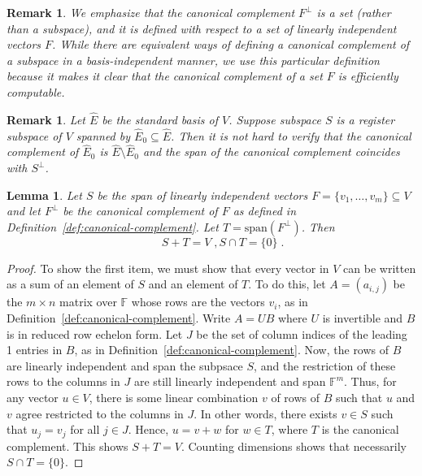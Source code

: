 \documentclass[11pt]{article}
\newtheorem{lemma}[theorem]{Lemma}
\newtheorem{remark}[theorem]{Remark}
\theoremstyle{definition}
\newcommand{\F}{\ensuremath{\mathbb{F}}}
\begin{document}
\begin{remark}
We emphasize that the canonical complement $F^\perp$ is a \emph{set} (rather than
a subspace), and it is defined with respect to a \emph{set} of linearly
independent vectors $F$. While there are equivalent ways of defining
a canonical complement of a \emph{subspace} in a basis-independent manner, 
we use this particular definition because it makes it clear that
the canonical complement of a set $F$ is efficiently computable. 
\end{remark}

\begin{remark}
  Let $\hat{E}$ be the standard basis of $V$.
  Suppose subspace $S$ is a register subspace of $V$ spanned by
  $\hat{E}_0 \subseteq \hat{E}$.
  Then it is not hard to verify that the canonical complement of $\hat{E}_{0}$ is
  $\hat{E}\setminus \hat{E}_0$ and the span of the canonical complement coincides with
  $S^\perp$.
\end{remark}


\begin{lemma}
  \label{lem:canonical-complement}
  Let $S$ be the span of linearly independent vectors $F = \{v_1,\ldots,v_m \}
  \subseteq V$ and let $F^\perp$ be the canonical complement of $F$ as defined
  in Definition~\ref{def:canonical-complement}.
  Let $T = \mathrm{span}(F^\perp)$.
  Then
  \begin{equation*}
   \qquad S + T = V\;,  S \cap T = \{ 0 \} \;.
  \end{equation*}
\end{lemma}

\begin{proof}
To show the first item, we must show that every vector in $V$ can be
written as a sum of an element of $S$ and an element of $T$. To do
this, let $A = (a_{i, j})$ be the $m\times n$ matrix over $\F$ whose
rows are the vectors $v_i$, as in Definition~\ref{def:canonical-complement}.
  Write $A = U B$ where $U$ is invertible and $B$ is in reduced row echelon
  form.
  Let $J$ be the set of column indices of the leading 1 entries in
  $B$, as in Definition~\ref{def:canonical-complement}.  
  Now, the rows of $B$ are linearly independent and span the subpsace $S$, and the restriction of
  these rows to the columns in $J$ are still linearly independent and
  span $\F^m$. Thus, for any vector $u \in V$, there is some linear
  combination $v$ of rows of $B$ such that $u$ and $v$ agree
  restricted to the columns in $J$. In other words, there exists $v
  \in S$ such that $u_j = v_j$ for all $j \in J$. Hence, $u = v + w$
  for $w \in T$, where $T$ is the canonical complement.
  This shows $S + T = V$.
  Counting dimensions shows that necessarily $S\cap T =
  \{0\}$.
\end{proof}
\end{document}
